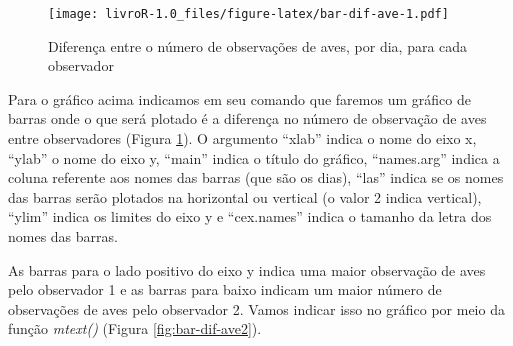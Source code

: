 \documentclass[]{book}
\newenvironment{Shaded}{\begin{snugshade}}{\end{snugshade}}
\newcommand{\DataTypeTok}[1]{\textcolor[rgb]{0.13,0.29,0.53}{#1}}
\newcommand{\DecValTok}[1]{\textcolor[rgb]{0.00,0.00,0.81}{#1}}
\newcommand{\FloatTok}[1]{\textcolor[rgb]{0.00,0.00,0.81}{#1}}
\newcommand{\KeywordTok}[1]{\textcolor[rgb]{0.13,0.29,0.53}{\textbf{#1}}}
\newcommand{\NormalTok}[1]{#1}
\newcommand{\OperatorTok}[1]{\textcolor[rgb]{0.81,0.36,0.00}{\textbf{#1}}}
\newcommand{\StringTok}[1]{\textcolor[rgb]{0.31,0.60,0.02}{#1}}
\begin{document}
\begin{figure}
\centering
\texttt{[image: livroR-1.0\_files/figure-latex/bar-dif-ave-1.pdf]}
\caption{\label{fig:bar-dif-ave}Diferença entre o número de observações de aves, por dia, para cada observador}
\end{figure}

Para o gráfico acima indicamos em seu comando que faremos um gráfico de barras onde o que será plotado é a diferença no número de observação de aves entre observadores (Figura \ref{fig:bar-dif-ave}). O argumento ``xlab'' indica o nome do eixo x, ``ylab'' o nome do eixo y, ``main'' indica o título do gráfico, ``names.arg'' indica a coluna referente aos nomes das barras (que são os dias), ``las'' indica se os nomes das barras serão plotados na horizontal ou vertical (o valor 2 indica vertical), ``ylim'' indica os limites do eixo y e ``cex.names'' indica o tamanho da letra dos nomes das barras.

As barras para o lado positivo do eixo y indica uma maior observação de aves pelo observador 1 e as barras para baixo indicam um maior número de observações de aves pelo observador 2. Vamos indicar isso no gráfico por meio da função \emph{mtext()} (Figura \ref{fig:bar-dif-ave2}).

\begin{Shaded}
\end{Shaded}
\end{document}
